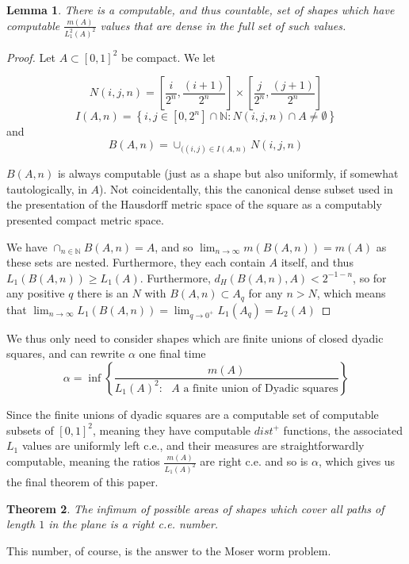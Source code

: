 \documentclass{journal}
\newtheorem{thm}{Theorem}[section]    %
\newtheorem{lem}[thm]{Lemma}          %
\theoremstyle{definition}
\newcommand{\N}{\mathbb{N}}
\begin{document}
\begin{lem}
There is a computable, and thus countable, set of shapes which have computable $\frac{m(A)}{L_1^2(A)^2}$ values that are dense in the full set of such values.
\end{lem}
\label{lem:inv}
\begin{proof}
    Let $A\subset [0,1]^2$ be compact. We let 

$$ N(i,j, n) = \left[\frac{i}{2^{n}}, \frac{(i+1)}{2^n}\right]\times\left[\frac{j}{2^{n}}, \frac{(j+1)}{2^n}\right]$$
$$ I(A,n) = \left\{ i,j \in [0,2^n]\cap\N: N(i,j,n)\cap A \neq \emptyset\right\}$$
and 
$$B(A,n) = \cup_{((i,j)\in I(A,n)}N(i,j,n)$$

$B(A,n)$ is always computable (just as a shape but also uniformly, if somewhat tautologically, in $A$). Not coincidentally, this the canonical dense subset used in the presentation of the Hausdorff metric space of the square as a computably presented compact metric space.

We have $\cap_{n\in\N} B(A,n) = A$, and so $\lim_{n\rightarrow \infty} m(B(A,n)) = m(A)$ as these sets are nested. Furthermore, they each contain $A$ itself, and thus $L_1(B(A,n)) \geq L_1(A)$. Furthermore, $d_H(B(A,n), A) < 2^{-1-n }$, so for any positive $q$ there is an $N$ with $B(A,n)\subset A_{q}$ for any $n > N$, which means that
$ \lim_{n\rightarrow \infty}L_1(B(A,n)) = \lim_{q\rightarrow 0^+}L_1 (A_q) = L_2(A)$
\end{proof}

We thus only need to consider shapes which are finite unions of closed dyadic squares, and can rewrite $\alpha$ one final time
$$\alpha = \inf\left\{\frac{m(A)}{L_1(A)^2: \text{ $A$ a finite union of Dyadic squares}}\right\}$$

Since the finite unions of dyadic squares are a computable set of computable subsets of $[0,1]^2$, meaning they have computable $dist^+$ functions, the associated $L_1$ values are uniformly left c.e., and their measures are straightforwardly computable, meaning the ratios $\frac{m(A)}{L_1(A)^2}$ are right c.e. and so is $\alpha$, which gives us the final theorem of this paper.

\begin{thm}
    The infimum of possible areas of shapes which cover all paths of length $1$ in the plane is a right c.e. number.
\end{thm}
\label{thm:Moser}

This number, of course, is the answer to the Moser worm problem.
%
%
%

%
\nocite{Zalgaller1}
\nocite{Zalgaller2}
\nocite{williams2002million}
\nocite{wetzel2005letter}
\nocite{isbell1957optimal}
\nocite{bell}
\nocite{finch2004lost}
\nocite{moser1966poorly}
\nocite{DH}
\nocite{klausw}
\nocite{bbi}

\end{document}
